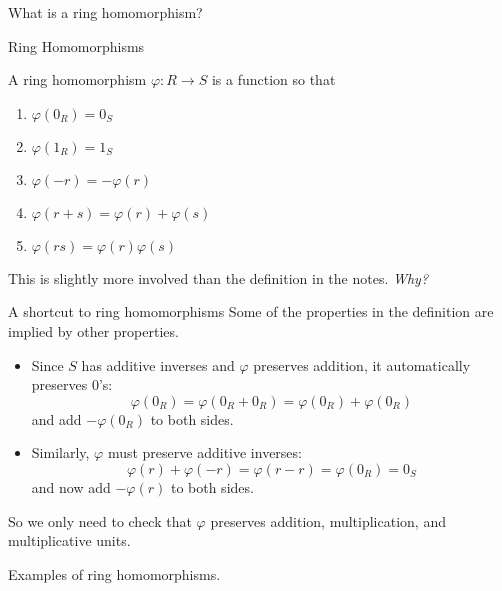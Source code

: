 \documentclass{beamer}
\begin{document}
\begin{frame}[plain,c]

\begin{center}

\Huge

What is a ring homomorphism?
\end{center}

\end{frame}
\begin{frame}{Ring Homomorphisms}
  \begin{definition}
    A ring homomorphism $\varphi:R\to S$ is a function so that
    \begin{enumerate}
    \item $\varphi(0_R)=0_S$
    \item $\varphi(1_R)=1_S$
     \item $\varphi(-r)=-\varphi(r)$
     \item $\varphi(r+s)=\varphi(r)+ \varphi(s)$
       \item $\varphi(rs)=\varphi(r)\varphi(s)$
      \end{enumerate}
\end{definition}  
This is slightly more involved than the definition in the notes.  \emph{Why?}
\end{frame}

\begin{frame}{A shortcut to ring homomorphisms}
  Some of the properties in the definition are implied by other properties.
  \begin{itemize}
  \item Since $S$ has additive inverses and $\varphi$ preserves addition, it automatically preserves $0$'s:
    $$\varphi(0_R)=\varphi(0_R+0_R)=\varphi(0_R)+\varphi(0_R)$$
    and add $-\varphi(0_R)$ to both sides.
  \item Similarly, $\varphi$ must preserve additive inverses:
    $$\varphi(r)+\varphi(-r)=\varphi(r-r)=\varphi(0_R)=0_S$$
    and now add $-\varphi(r)$ to both sides.
  \end{itemize}

So we only need to check that $\varphi$ preserves addition, multiplication, and multiplicative units.
  \end{frame}


\begin{frame}[plain,c]

\begin{center}

\Huge

Examples of ring homomorphisms.
\end{center}

\end{frame}
\end{document}
